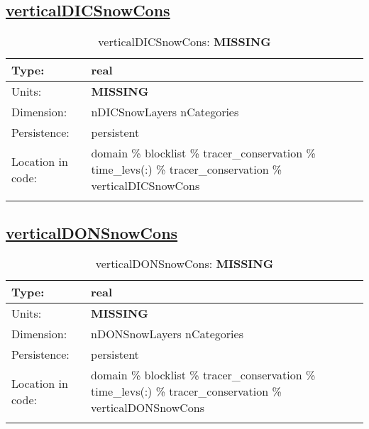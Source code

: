 \subsection[verticalDICSnowCons]{\hyperref[sec:var_tab_tracer_conservation]{verticalDICSnowCons}}
\label{subsec:var_sec_tracer_conservation_verticalDICSnowCons}
\begin{center}
\begin{longtable}{| p{2.0in} | p{4.0in} |}
        \hline 
        Type: & real \\
        \hline 
        Units: & {\bf \color{red} MISSING} \\
        \hline 
        Dimension: & nDICSnowLayers nCategories \\
        \hline 
        Persistence: & persistent \\
        \hline 
         Location in code: & domain \% blocklist \% tracer\_conservation \% time\_levs(:) \% tracer\_conservation \% verticalDICSnowCons \\
         \hline 
    \caption{verticalDICSnowCons: {\bf \color{red} MISSING}}
\end{longtable}
\end{center}
\subsection[verticalDONSnowCons]{\hyperref[sec:var_tab_tracer_conservation]{verticalDONSnowCons}}
\label{subsec:var_sec_tracer_conservation_verticalDONSnowCons}
\begin{center}
\begin{longtable}{| p{2.0in} | p{4.0in} |}
        \hline 
        Type: & real \\
        \hline 
        Units: & {\bf \color{red} MISSING} \\
        \hline 
        Dimension: & nDONSnowLayers nCategories \\
        \hline 
        Persistence: & persistent \\
        \hline 
         Location in code: & domain \% blocklist \% tracer\_conservation \% time\_levs(:) \% tracer\_conservation \% verticalDONSnowCons \\
         \hline 
    \caption{verticalDONSnowCons: {\bf \color{red} MISSING}}
\end{longtable}
\end{center}
